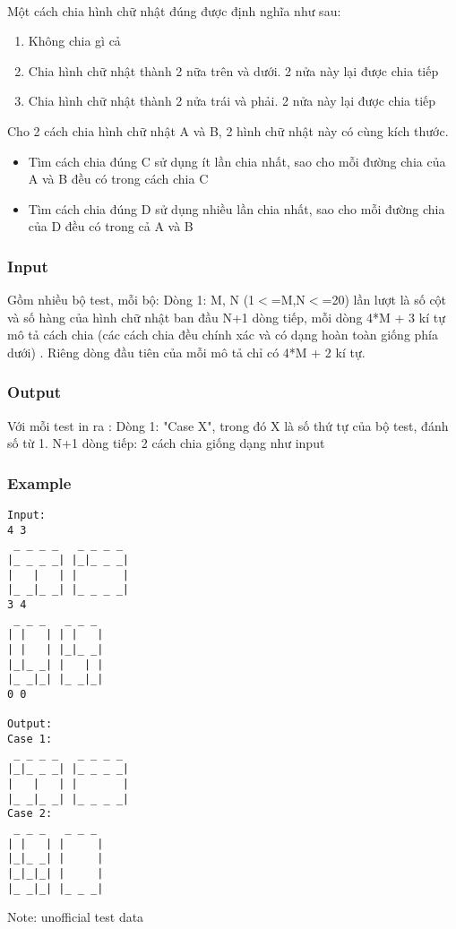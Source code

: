 

 

Một cách chia hình chữ nhật đúng được định nghĩa như sau:
\begin{enumerate}
	\item Không chia gì cả
	\item Chia hình chữ nhật thành 2 nữa trên và dưới. 2 nửa này lại được chia tiếp
	\item Chia hình chữ nhật thành 2 nửa trái và phải. 2 nửa này lại được chia tiếp
\end{enumerate}

Cho 2 cách chia hình chữ nhật A và B, 2 hình chữ nhật này có cùng kích thước.
\begin{itemize}
	\item Tìm cách chia đúng C sử dụng ít lần chia nhất, sao cho mỗi đường chia của A và B đều có trong cách chia C
	\item Tìm cách chia đúng D sử dụng nhiều lần chia nhất, sao cho mỗi đường chia của D đều có trong cả A và B
\end{itemize}

\subsubsection{Input}

Gồm nhiều bộ test, mỗi bộ: Dòng 1: M, N (1$<$=M,N$<$=20) lần lượt là số cột và số hàng của hình chữ nhật ban đầu N+1 dòng tiếp, mỗi dòng 4*M + 3 kí tự mô tả cách chia (các cách chia đều chính xác và có dạng hoàn toàn giống phía dưới) . Riêng dòng đầu tiên của mỗi mô tả chỉ có 4*M + 2 kí tự.

\subsubsection{Output}

Với mỗi test in ra : Dòng 1: "Case X", trong đó X là số thứ tự của bộ test, đánh số từ 1. N+1 dòng tiếp: 2 cách chia giống dạng như input

\subsubsection{Example}
\begin{verbatim}
Input:
4 3
 _ _ _ _   _ _ _ _ 
|_ _ _ _| |_|_ _ _|
|   |   | |       |
|_ _|_ _| |_ _ _ _|
3 4
 _ _ _   _ _ _ 
| |   | | |   |
| |   | |_|_ _|
|_|_ _| |   | |
|_ _|_| |_ _|_|
0 0

Output:
Case 1:
 _ _ _ _   _ _ _ _ 
|_|_ _ _| |_ _ _ _|
|   |   | |       |
|_ _|_ _| |_ _ _ _|
Case 2:
 _ _ _   _ _ _ 
| |   | |     |
|_|_ _| |     |
|_|_|_| |     |
|_ _|_| |_ _ _|

\end{verbatim}

Note: unofficial test data